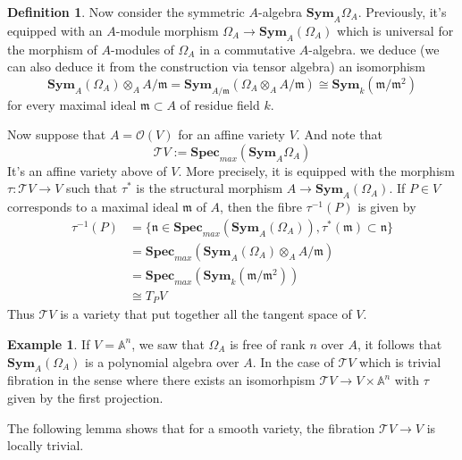 \documentclass[12pt,a4paper,english]{article}
\theoremstyle{plain}
\theoremstyle{definition}
\newtheorem{defi}{Definition}
\newtheorem*{example}{Example}
\theoremstyle{remark}
\newcommand{\spm}{\mathbf{Spec}_{max}}
\newcommand{\sym}{\textbf{Sym}}
\begin{document}
\begin{defi}
Now consider the symmetric $A$-algebra $\sym_{A}\Omega_{A}$. Previously, it's equipped with an $A$-module morphism $\Omega_{A}\rightarrow \sym_{A}(\Omega_{A})$ which is universal for the morphism of $A$-modules of $\Omega_{A}$ in a commutative $A$-algebra. we deduce (we can also deduce it from the construction via tensor algebra) an isomorphism 
\begin{equation*}
    \sym_{A}(\Omega_{A})\otimes_{A}A/\mathfrak{m} =\sym_{A/\mathfrak{m}}(\Omega_{A}\otimes_{A}A/\mathfrak{m})\cong \sym_{k}(\mathfrak{m}/\mathfrak{m}^{2})
\end{equation*}
for every maximal ideal $\mathfrak{m}\subset A$ of residue field $k$.

Now suppose that $A=\mathcal{O}(V)$ for an affine variety $V$. And note that 
\begin{equation*}
    \mathcal{T}V:=\spm(\sym_{A}\Omega_{A})
\end{equation*}
It's an affine variety above of $V$. More precisely, it is equipped with the morphism $\tau:\mathcal{T}V\rightarrow V$ such that $\tau^{*}$ is the structural morphism $A\rightarrow \sym_{A}(\Omega_{A})$. If $P\in V$ corresponds to a maximal ideal $\mathfrak{m}$ of $A$, then the fibre $\tau^{-1}(P)$ is given by 
\begin{align*}
    \tau^{-1}(P)&=\{\mathfrak{n}\in\spm(\sym_{A}(\Omega_{A})), \tau^{*}(\mathfrak{m})\subset\mathfrak{n}\}\\
    &=\spm(\sym_{A}(\Omega_{A})\otimes_{A}A/\mathfrak{m})\\
    &=\spm(\sym_{k}(\mathfrak{m}/\mathfrak{m}^{2}))\\
    &\cong T_{P}V
\end{align*}
Thus $\mathcal{T}V$ is a variety that put together all the tangent space of $V$.   
\end{defi}
\begin{example}
If $V=\mathbb{A}^{n}$, we saw that $\Omega_{A}$ is free of rank $n$ over $A$, it follows that $\sym_{A}(\Omega_{A})$ is a polynomial algebra over $A$. In the case of $\mathcal{T}V$ which is trivial fibration in the sense where there exists an isomorhpism $\mathcal{T}V\rightarrow V\times\mathbb{A}^{n}$ with $\tau $ given by the first projection.

\end{example}

The following lemma shows that for a smooth variety, the fibration $\mathcal{T}V\rightarrow V$ is locally trivial.
\end{document}
